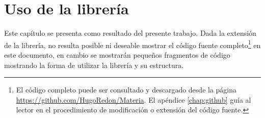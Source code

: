 \chapter{Uso de la librería}\label{chap:libraryUse}
	
	Este capítulo se presenta como resultado del presente trabajo. Dada la extensión de la librería, no resulta posible ni deseable mostrar el código fuente completo\footnote{El código completo puede ser consultado y descargado desde la página \url{https://github.com/HugoRedon/Materia}. El apéndice \ref{chap:github} guía al lector en el procedimiento de modificación o extensión del código fuente.} en este documento, en cambio se mostrarán pequeños fragmentos de código mostrando la forma de utilizar la librería y su estructura.
		
